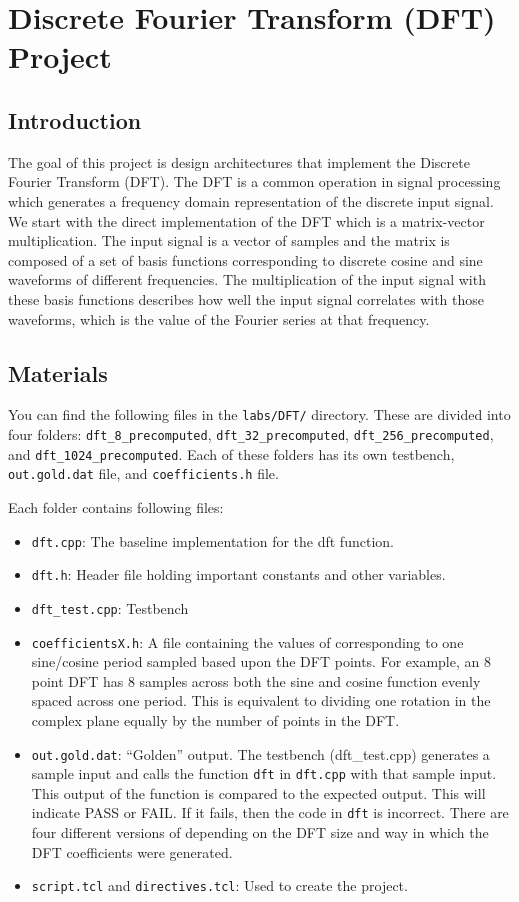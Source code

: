 \chapter{Discrete Fourier Transform (DFT) Project}
\glsresetall
\label{chapter:DFT_project}

\section{Introduction}
The goal of this project is design architectures that implement the Discrete Fourier Transform (DFT).  The DFT is a common operation in signal processing which generates a frequency domain representation of the discrete input signal. We start with the direct implementation of the DFT which is a matrix-vector multiplication. The input signal is a vector of samples and the matrix is composed of a set of basis functions corresponding to discrete cosine and sine waveforms of different frequencies. The multiplication of the input signal with these basis functions describes how well the input signal correlates with those waveforms, which is the value of the Fourier series at that frequency.

\section{Materials}
You can find the following files in the \texttt{labs/DFT/} directory. These are divided into four folders: \texttt{dft\_8\_precomputed}, \texttt{dft\_32\_precomputed}, \texttt{dft\_256\_precomputed}, and \texttt{dft\_1024\_precomputed}. Each of these folders has its own testbench, \texttt{out.gold.dat} file, and \texttt{coefficients.h} file.

Each folder contains following files:
\begin{itemize}
\item \texttt{dft.cpp}: The baseline implementation for the dft function.
\item \texttt{dft.h}: Header file holding important constants and other variables.
\item \texttt{dft\_test.cpp}: Testbench
\item \texttt{coefficientsX.h}: A file containing the values of corresponding to one sine/cosine period sampled based upon the DFT points. For example, an 8 point DFT has 8 samples across both the sine and cosine function evenly spaced across one period. This is equivalent to dividing one rotation in the complex plane equally by the number of points in the DFT. 
\item \texttt{out.gold.dat}: ``Golden'' output. The testbench (dft\_test.cpp) generates a sample input and calls the function \texttt{dft} in \texttt{dft.cpp} with that sample input. This output of the function is compared to the expected output. This will indicate PASS or FAIL. If it fails, then the code in \texttt{dft} is incorrect. There are four different versions of depending on the DFT size and way in which the DFT coefficients were generated.
\item \texttt{script.tcl} and \texttt{directives.tcl}: Used to create the project. 
\end{itemize}

